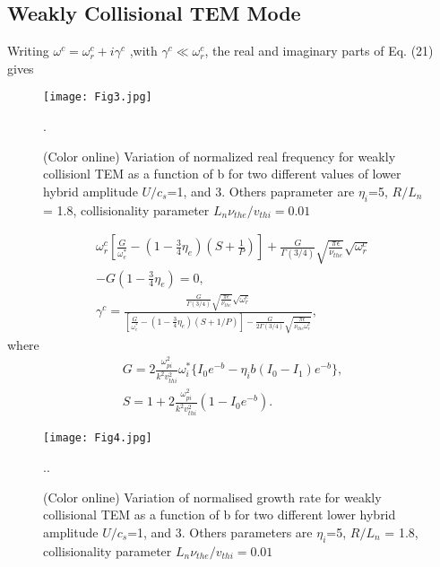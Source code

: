 \documentclass[aip,pop,amsmath,amssymb,showpacs,reprint,floatfix,lengthcheck]{revtex4-1}
\begin{document}
\subsection{Weakly Collisional TEM Mode}
Writing $\omega^{c}=\omega_{r}^{c}+i\gamma^{c}$ ,with $\gamma^{c}\ll \omega_{r}^{c}$,  the real and imaginary parts  of Eq. (21)  gives 
\begin{figure}
 \centering
 \texttt{[image: Fig3.jpg]}
 \caption{(Color online) Variation of normalized real frequency for weakly collisionl TEM as a function of b for two different values of lower hybrid amplitude $U/c_{s}$=1, and 3. Others paprameter are $\eta_{i}$=5, $R/L_{n}$ = 1.8, collisionality parameter $L_{n}\nu_{the}/v_{thi}=0.01$}.
 \label{fig:3}
\end{figure}
\begin{eqnarray}
 \omega_{r}^{c}[\frac{G}{\omega_{e}^*}-(1-\frac{3}{4}\eta_{e})(S+\frac{1}{P})]+\frac{G}{\Gamma(3/4)}\sqrt{\frac{\pi\epsilon}{\nu_{the}}}\sqrt{\omega_{r}^c}\nonumber\\
-G(1-\frac{3}{4}\eta_{e})=0,\nonumber\\
\gamma^c=\frac{\frac{G}{\Gamma(3/4)}\sqrt{\frac{\pi\epsilon}{\nu_{the}}}\sqrt{\omega_{r}^c}}{[\frac{G}{\omega_{e}^*}-(1-\frac{3}{4}\eta_{e})(S+1/P)]-\frac{G}{2\Gamma(3/4)}\sqrt{\frac{\pi\epsilon}{\nu_{the}\omega_{r}^c}}},
\end{eqnarray}
where
\begin{eqnarray}
G=2\frac{\omega_{pi}^2}{k^2v_{thi}^2}\omega_{i}^*\biggl\{I_{0}e^{-b}-\eta_{i}b(I_{0}-I_{1})e^{-b}\biggr\},\nonumber\\
S=1+2\frac{\omega_{pi}^2}{k^2v_{thi}^2}(1-I_{0}e^{-b}).
\end{eqnarray}
\begin{figure}
 \centering
 \texttt{[image: Fig4.jpg]}
 \caption{(Color online) Variation of normalised growth rate for weakly collisional TEM as a function of b for two different lower hybrid amplitude $U/c_{s}$=1, and 3. Others parameters are $\eta_{i}$=5, $R/L_{n}$ = 1.8, collisionality parameter $L_{n}\nu_{the}/v_{thi}=0.01$}..
 \label{fig:4}
\end{figure}
\end{document}

